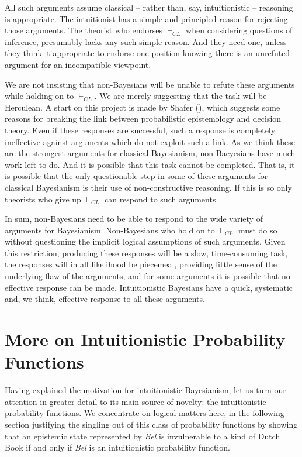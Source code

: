 \documentclass[
  11pt,
  letterpaper,
  DIV=11,
  numbers=noendperiod,
  twoside]{scrartcl}
\begin{document}
All such arguments assume classical -- rather than, say, intuitionistic
-- reasoning is appropriate. The intuitionist has a simple and
principled reason for rejecting those arguments. The theorist who
endorses \(\vdash_{CL}\) when considering questions of inference,
presumably lacks any such simple reason. And they need one, unless they
think it appropriate to endorse one position knowing there is an
unrefuted argument for an incompatible viewpoint.

We are not insisting that non-Bayesians will be unable to refute these
arguments while holding on to \(\vdash_{CL}\). We are merely suggesting
that the task will be Herculean. A start on this project is made by
Shafer (), which suggests some reasons
for breaking the link between probabilistic epistemology and decision
theory. Even if these responses are successful, such a response is
completely ineffective against arguments which do not exploit such a
link. As we think these are the strongest arguments for classical
Bayesianism, non-Baeyesians have much work left to do. And it is
possible that this task cannot be completed. That is, it is possible
that the only questionable step in some of these arguments for classical
Bayesianism is their use of non-constructive reasoning. If this is so
only theorists who give up \(\vdash_{CL}\) can respond to such
arguments.

In sum, non-Bayesians need to be able to respond to the wide variety of
arguments for Bayesianism. Non-Bayesians who hold on to \(\vdash_{CL}\)
must do so without questioning the implicit logical assumptions of such
arguments. Given this restriction, producing these responses will be a
slow, time-consuming task, the responses will in all likelihood be
piecemeal, providing little sense of the underlying flaw of the
arguments, and for some arguments it is possible that no effective
response can be made. Intuitionistic Bayesians have a quick, systematic
and, we think, effective response to all these arguments.

\section{More on Intuitionistic Probability
Functions}\label{more-on-intuitionistic-probability-functions}

Having explained the motivation for intuitionistic Bayesianism, let us
turn our attention in greater detail to its main source of novelty: the
intuitionistic probability functions. We concentrate on logical matters
here, in the following section justifying the singling out of this class
of probability functions by showing that an epistemic state represented
by \emph{Bel} is invulnerable to a kind of Dutch Book if and only if
\emph{Bel} is an intuitionistic probability function.
\end{document}
